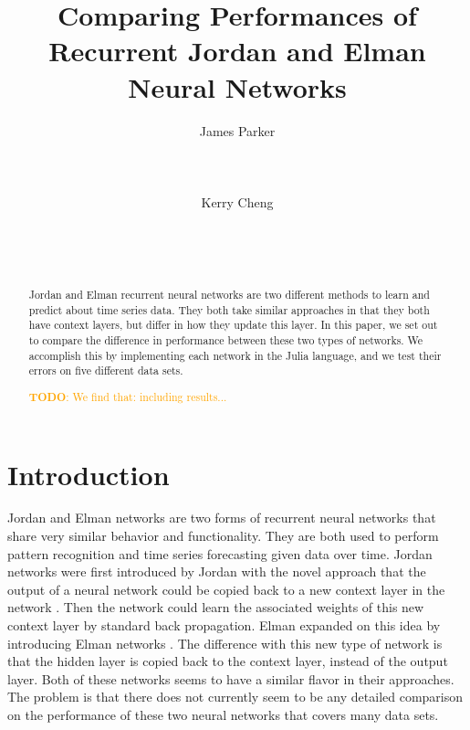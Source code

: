 \documentclass{acm_proc_article-sp}
\newcommand{\todo}[1]{\textcolor{orange}{\textbf{TODO}: #1}} %
\begin{document}
\title{Comparing Performances of Recurrent Jordan and Elman Neural Networks}
\author{
\alignauthor James Parker\\%
       \\
       \\
       \\
\alignauthor Kerry Cheng\\%
       \\
       \\
       \\
}

\maketitle

\begin{abstract}
Jordan and Elman recurrent neural networks are two different methods to learn and predict about time series data. 
They both take similar approaches in that they both have context layers, but differ in how they update this layer. 
In this paper, we set out to compare the difference in performance between these two types of networks. %
We accomplish this by implementing each network in the Julia language, and we test their errors on five different data sets. 


\todo{We find that: including results...}
\end{abstract}
\section{Introduction} %
Jordan and Elman networks are two forms of recurrent neural networks that share very similar behavior and functionality. 
They are both used to perform pattern recognition and time series forecasting given data over time. 
Jordan networks were first introduced by Jordan with the novel approach that the output of a neural network could be copied back to a new context layer in the network \cite{jordan}. Then the network could learn the associated weights of this new context layer by standard back propagation. 
Elman expanded on this idea by introducing Elman networks \cite{elman}. 
The difference with this new type of network is that the hidden layer is copied back to the context layer, instead of the output layer. 
Both of these networks seems to have a similar flavor in their approaches.
The problem is that there does not currently seem to be any detailed comparison on the performance of these two neural networks that covers many data sets. 
\end{document}
